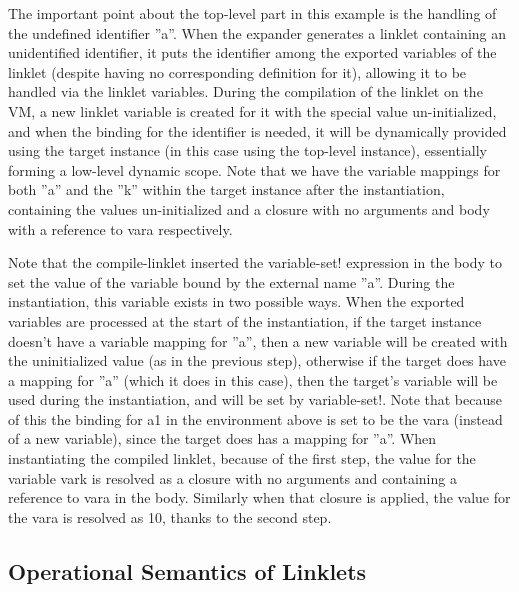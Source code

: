 		\begin{paragraph-here}
			The important point about the top-level part in this example is the handling of the undefined identifier ”a”. When the expander generates a linklet containing an unidentified identifier, it puts the identifier among the exported variables of the linklet (despite having no corresponding definition for it), allowing it to be handled via the linklet variables. During the compilation of the linklet on the VM, a new linklet variable is created for it with the special value un-initialized, and when the binding for the identifier is needed, it will be dynamically provided using the target instance (in this case using the top-level instance), essentially forming a low-level dynamic scope. Note that we have the variable mappings for both ”a” and the ”k” within the target instance after the instantiation, containing the values un-initialized and a closure with no arguments and body with a reference to vara respectively.
		\end{paragraph-here}


		\begin{paragraph-here}
			Note that the compile-linklet inserted the variable-set! expression in the body to set the value of the variable bound by the external name ”a”. During the instantiation, this variable exists in two possible ways. When the exported variables are processed at the start of the instantiation, if the target instance doesn’t have a variable mapping for ”a”, then a new variable will be created with the uninitialized value (as in the previous step), otherwise if the target does have a mapping for ”a” (which it does in this case), then the target’s variable will be used during the instantiation, and will be set by variable-set!. Note that because of this the binding for a1 in the environment above is set to be the vara (instead of a new variable), since the target does has a mapping for ”a”.
			When instantiating the compiled linklet, because of the first step, the value for the variable vark is resolved as a closure with no arguments and containing a reference to vara in the body. Similarly when that closure is applied, the value for the vara is resolved as 10, thanks to the second step.
		\end{paragraph-here}


		\subsection{Operational Semantics of Linklets}

